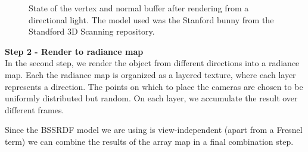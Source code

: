 \begin{figure}
\centering
{}
\label{fig:lightbuffers}
\caption{State of the vertex and normal buffer after rendering from a directional light. The model used was the Stanford bunny from the Standford 3D Scanning repository.}
\end{figure}

\FloatBarrier

\textbf{Step 2 - Render to radiance map} \\
In the second step, we render the object from different directions into a radiance map. Each the radiance map is organized as a layered texture, where each layer represents a direction. The points on which to place the cameras are chosen to be uniformly distributed but random. On each layer, we accumulate the result over different frames.


Since the BSSRDF model we are using is view-independent (apart from a Fresnel term) we can combine the results of the array map in a final combination step.

